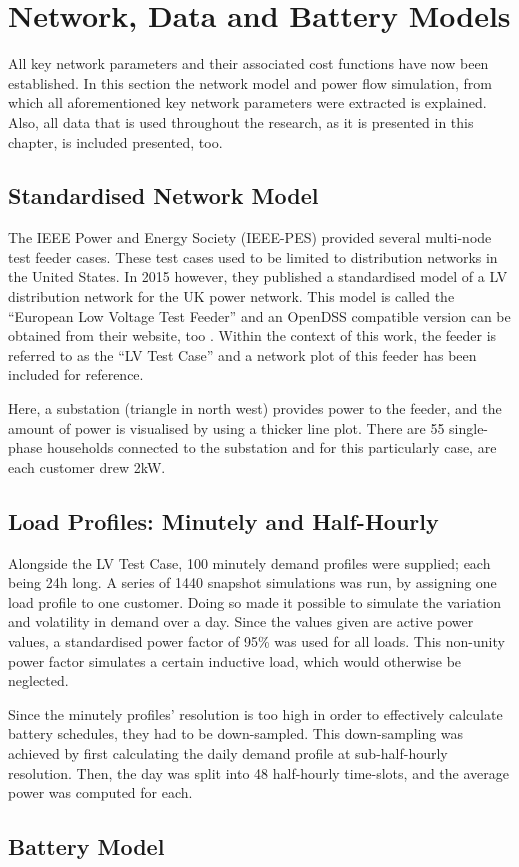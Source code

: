 \section{Network, Data and Battery Models}
\label{ch1:sec:data-and-network-models}

All key network parameters and their associated cost functions have now been established.
In this section the network model and power flow simulation, from which all aforementioned key network parameters were extracted is explained.
Also, all data that is used throughout the research, as it is presented in this chapter, is included presented, too.

\subsection{Standardised Network Model}
\label{ch1:subsec:standardised-network-model}

The IEEE Power and Energy Society (IEEE-PES) provided several multi-node test feeder cases.
These test cases used to be limited to distribution networks in the United States.
In 2015 however, they published a standardised model of a LV distribution network for the UK power network.
This model is called the ``European Low Voltage Test Feeder'' and an OpenDSS compatible version can be obtained from their website, too \cite{DistributionTestFeeders2017}.
Within the context of this work, the feeder is referred to as the ``LV Test Case'' and a network plot of this feeder has been included for reference.



Here, a substation (triangle in north west) provides power to the feeder, and the amount of power is visualised by using a thicker line plot.
There are 55 single-phase households connected to the substation and for this particularly case, are each customer drew 2kW.

\subsection{Load Profiles: Minutely and Half-Hourly}

Alongside the LV Test Case, 100 minutely demand profiles were supplied; each being 24h long.
A series of 1440 snapshot simulations was run, by assigning one load profile to one customer.
Doing so made it possible to simulate the variation and volatility in demand over a day.
Since the values given are active power values, a standardised power factor of 95\% was used for all loads.
This non-unity power factor simulates a certain inductive load, which would otherwise be neglected.

Since the minutely profiles' resolution is too high in order to effectively calculate battery schedules, they had to be down-sampled.
This down-sampling was achieved by first calculating the daily demand profile at sub-half-hourly resolution.
Then, the day was split into 48 half-hourly time-slots, and the average power was computed for each.

\subsection{Battery Model}

